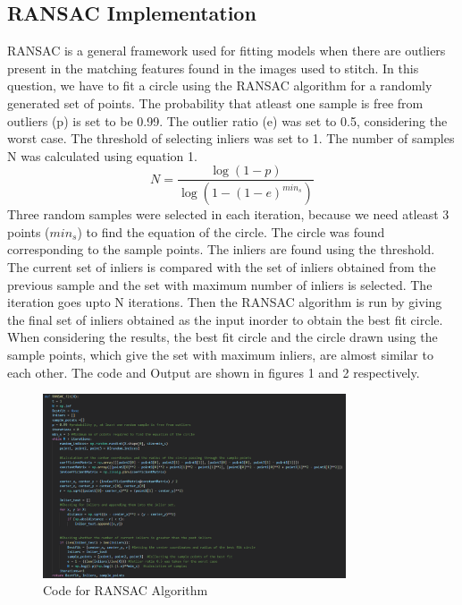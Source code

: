 \documentclass[10.5pt]{article}
\begin{document}
\begin{flushleft}
\section{RANSAC Implementation}
RANSAC is a general framework used for fitting models when there are outliers present in the matching features found in the images used to stitch. In this question, we have to fit a circle using the RANSAC algorithm for a randomly generated set of points. 
The probability that atleast one sample is free from outliers (p) is set to be 0.99. The outlier ratio (e) was set to 0.5, considering the worst case. The threshold of selecting inliers was set to 1. The number of samples N was calculated using equation 1.
\begin{equation}\label{Equation 1: Number of samples}
    N = \frac{\log(1-p)}{\log(1-(1-e)^{min_s})}
\end{equation}
Three random samples were selected in each iteration, because we need atleast 3 points ($min_{s}$) to find the equation of the circle. The circle was found corresponding to the sample points. The inliers are found using the threshold. The current set of inliers is compared with the set of inliers obtained from the previous sample and the set with maximum number of inliers is selected. The iteration goes upto N iterations. Then the RANSAC algorithm is run by giving the final set of inliers obtained as the input inorder to obtain the best fit circle. 
\newline
When considering the results, the best fit circle and the circle drawn using the sample points, which give the set with maximum inliers, are almost similar to each other. The code and Output are shown in figures 1 and 2 respectively.    

\begin{figure}[htp]
    \centering
    \includegraphics[width=0.8\textwidth]{Question1code.png}
    \caption{Code for RANSAC Algorithm}
\end{figure}


\end{flushleft}
\end{document}
